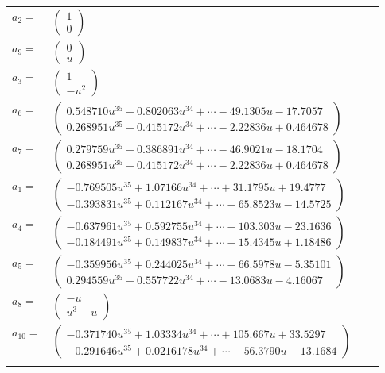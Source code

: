 \documentclass[1p]{elsarticle_modified}
\theoremstyle{definition}
\begin{document}
\begin{tabular}{m{7pt} m{180pt} m{7pt} m{180pt} }
\flushright $a_{2}=$&$\begin{pmatrix}1\\0\end{pmatrix}$ \\
\flushright $a_{9}=$&$\begin{pmatrix}0\\u\end{pmatrix}$ \\
\flushright $a_{3}=$&$\begin{pmatrix}1\\- u^2\end{pmatrix}$ \\
\flushright $a_{6}=$&$\begin{pmatrix}0.548710 u^{35}-0.802063 u^{34}+\cdots-49.1305 u-17.7057\\0.268951 u^{35}-0.415172 u^{34}+\cdots-2.22836 u+0.464678\end{pmatrix}$ \\
\flushright $a_{7}=$&$\begin{pmatrix}0.279759 u^{35}-0.386891 u^{34}+\cdots-46.9021 u-18.1704\\0.268951 u^{35}-0.415172 u^{34}+\cdots-2.22836 u+0.464678\end{pmatrix}$ \\
\flushright $a_{1}=$&$\begin{pmatrix}-0.769505 u^{35}+1.07166 u^{34}+\cdots+31.1795 u+19.4777\\-0.393831 u^{35}+0.112167 u^{34}+\cdots-65.8523 u-14.5725\end{pmatrix}$ \\
\flushright $a_{4}=$&$\begin{pmatrix}-0.637961 u^{35}+0.592755 u^{34}+\cdots-103.303 u-23.1636\\-0.184491 u^{35}+0.149837 u^{34}+\cdots-15.4345 u+1.18486\end{pmatrix}$ \\
\flushright $a_{5}=$&$\begin{pmatrix}-0.359956 u^{35}+0.244025 u^{34}+\cdots-66.5978 u-5.35101\\0.294559 u^{35}-0.557722 u^{34}+\cdots-13.0683 u-4.16067\end{pmatrix}$ \\
\flushright $a_{8}=$&$\begin{pmatrix}- u\\u^3+u\end{pmatrix}$ \\
\flushright $a_{10}=$&$\begin{pmatrix}-0.371740 u^{35}+1.03334 u^{34}+\cdots+105.667 u+33.5297\\-0.291646 u^{35}+0.0216178 u^{34}+\cdots-56.3790 u-13.1684\end{pmatrix}$\\&\end{tabular}
\end{document}
